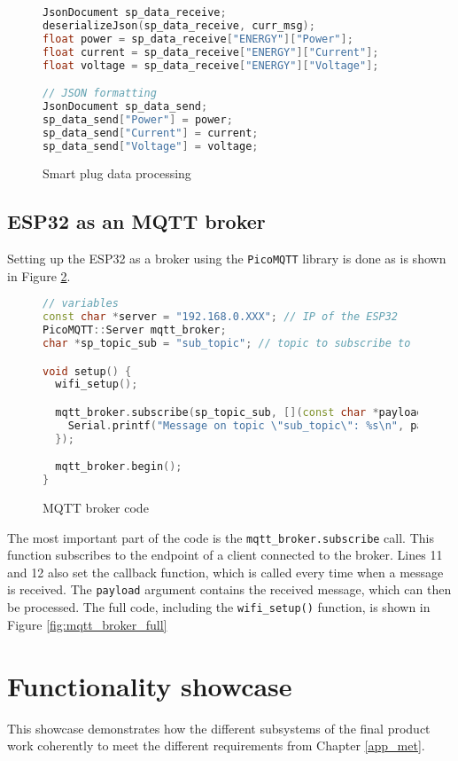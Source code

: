 \begin{figure}[ht]
    \centering
    \begin{lstlisting}[language=ino, firstnumber=1]
JsonDocument sp_data_receive;
deserializeJson(sp_data_receive, curr_msg);
float power = sp_data_receive["ENERGY"]["Power"];
float current = sp_data_receive["ENERGY"]["Current"];
float voltage = sp_data_receive["ENERGY"]["Voltage"];

// JSON formatting
JsonDocument sp_data_send;
sp_data_send["Power"] = power;
sp_data_send["Current"] = current;
sp_data_send["Voltage"] = voltage;
    \end{lstlisting}
    \caption{Smart plug data processing}
    \label{fig:smart_plug_processing}
\end{figure}

\subsection{ESP32 as an MQTT broker}
Setting up the ESP32 as a broker using the \lstinline|PicoMQTT| library is done as is shown in Figure \ref{fig:mqtt_broker}.

\begin{figure}[ht]
    \centering
    \begin{lstlisting}[language=ino, firstnumber=1]
// variables
const char *server = "192.168.0.XXX"; // IP of the ESP32
PicoMQTT::Server mqtt_broker;
char *sp_topic_sub = "sub_topic"; // topic to subscribe to 

void setup() {
  wifi_setup();

  mqtt_broker.subscribe(sp_topic_sub, [](const char *payload) {
    Serial.printf("Message on topic \"sub_topic\": %s\n", payload);
  });

  mqtt_broker.begin();
}
    \end{lstlisting}
    \caption{MQTT broker code}
    \label{fig:mqtt_broker}
\end{figure}

The most important part of the code is the \lstinline|mqtt_broker.subscribe| call. This function subscribes to the endpoint of a client connected to the broker. Lines 11 and 12 also set the callback function, which is called every time when a message is received. The \lstinline|payload| argument contains the received message, which can then be processed. The full code, including the \lstinline|wifi_setup()| function, is shown in Figure \ref{fig:mqtt_broker_full}   


\section{Functionality showcase}\label{chap:func_test}
This showcase demonstrates how the different subsystems of the final product work coherently to meet the different requirements from Chapter \ref{app_met}.

